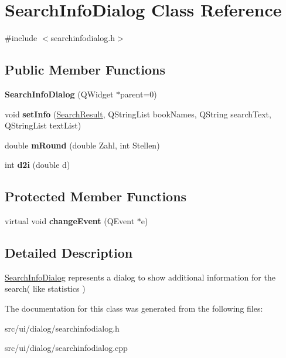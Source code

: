 \hypertarget{classSearchInfoDialog}{
\section{SearchInfoDialog Class Reference}
\label{classSearchInfoDialog}
}


{\ttfamily \#include $<$searchinfodialog.h$>$}\subsection*{Public Member Functions}
\begin{DoxyCompactItemize}
\item 
\hypertarget{classSearchInfoDialog_a1baf3903eb275cf883a38cc533011132}{
{\bfseries SearchInfoDialog} (QWidget $\ast$parent=0)}
\label{classSearchInfoDialog_a1baf3903eb275cf883a38cc533011132}

\item 
\hypertarget{classSearchInfoDialog_a6d0179b3897eadc1e9448115f81eec2e}{
void {\bfseries setInfo} (\hyperlink{classSearchResult}{SearchResult}, QStringList bookNames, QString searchText, QStringList textList)}
\label{classSearchInfoDialog_a6d0179b3897eadc1e9448115f81eec2e}

\item 
\hypertarget{classSearchInfoDialog_a14b9e98ca49d1a408ec94772aeef6f5e}{
double {\bfseries mRound} (double Zahl, int Stellen)}
\label{classSearchInfoDialog_a14b9e98ca49d1a408ec94772aeef6f5e}

\item 
\hypertarget{classSearchInfoDialog_a8b550144a861f190deae6c8b11c891e8}{
int {\bfseries d2i} (double d)}
\label{classSearchInfoDialog_a8b550144a861f190deae6c8b11c891e8}

\end{DoxyCompactItemize}
\subsection*{Protected Member Functions}
\begin{DoxyCompactItemize}
\item 
\hypertarget{classSearchInfoDialog_a011443f10f6863a165787edfc1db61f7}{
virtual void {\bfseries changeEvent} (QEvent $\ast$e)}
\label{classSearchInfoDialog_a011443f10f6863a165787edfc1db61f7}

\end{DoxyCompactItemize}


\subsection{Detailed Description}
\hyperlink{classSearchInfoDialog}{SearchInfoDialog} represents a dialog to show additional information for the search( like statistics ) 

The documentation for this class was generated from the following files:\begin{DoxyCompactItemize}
\item 
src/ui/dialog/searchinfodialog.h\item 
src/ui/dialog/searchinfodialog.cpp\end{DoxyCompactItemize}
